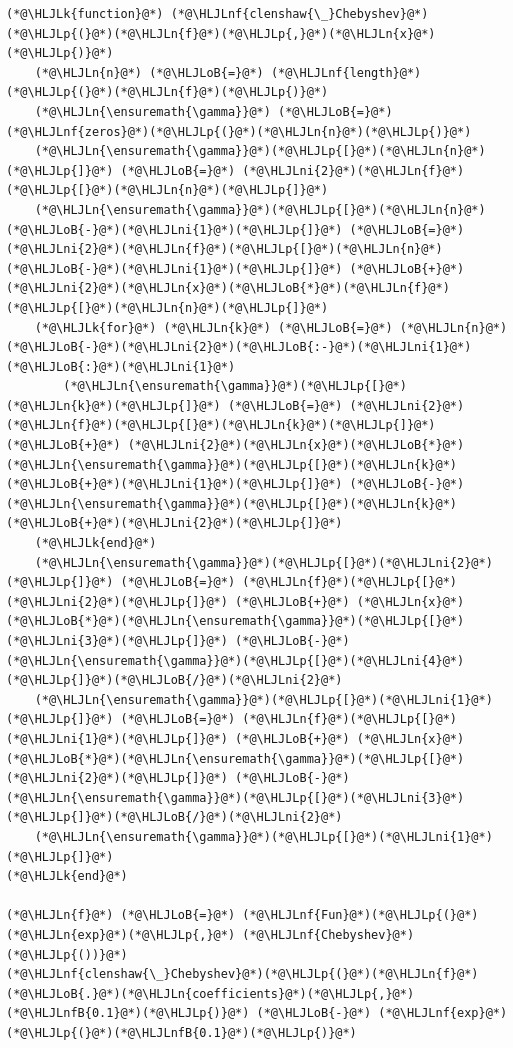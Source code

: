 \documentclass[12pt,a4paper]{article}
\newcommand{\HLJLk}[1]{\textcolor[RGB]{148,91,176}{\textbf{#1}}}
\newcommand{\HLJLn}[1]{#1}
\newcommand{\HLJLnf}[1]{\textcolor[RGB]{66,102,213}{#1}}
\newcommand{\HLJLnfB}[1]{\textcolor[RGB]{59,151,46}{#1}}
\newcommand{\HLJLni}[1]{\textcolor[RGB]{59,151,46}{#1}}
\newcommand{\HLJLoB}[1]{\textcolor[RGB]{102,102,102}{\textbf{#1}}}
\newcommand{\HLJLp}[1]{#1}
\begin{document}
\begin{lstlisting}
(*@\HLJLk{function}@*) (*@\HLJLnf{clenshaw{\_}Chebyshev}@*)(*@\HLJLp{(}@*)(*@\HLJLn{f}@*)(*@\HLJLp{,}@*)(*@\HLJLn{x}@*)(*@\HLJLp{)}@*)
    (*@\HLJLn{n}@*) (*@\HLJLoB{=}@*) (*@\HLJLnf{length}@*)(*@\HLJLp{(}@*)(*@\HLJLn{f}@*)(*@\HLJLp{)}@*)
    (*@\HLJLn{\ensuremath{\gamma}}@*) (*@\HLJLoB{=}@*) (*@\HLJLnf{zeros}@*)(*@\HLJLp{(}@*)(*@\HLJLn{n}@*)(*@\HLJLp{)}@*)
    (*@\HLJLn{\ensuremath{\gamma}}@*)(*@\HLJLp{[}@*)(*@\HLJLn{n}@*)(*@\HLJLp{]}@*) (*@\HLJLoB{=}@*) (*@\HLJLni{2}@*)(*@\HLJLn{f}@*)(*@\HLJLp{[}@*)(*@\HLJLn{n}@*)(*@\HLJLp{]}@*)
    (*@\HLJLn{\ensuremath{\gamma}}@*)(*@\HLJLp{[}@*)(*@\HLJLn{n}@*)(*@\HLJLoB{-}@*)(*@\HLJLni{1}@*)(*@\HLJLp{]}@*) (*@\HLJLoB{=}@*) (*@\HLJLni{2}@*)(*@\HLJLn{f}@*)(*@\HLJLp{[}@*)(*@\HLJLn{n}@*)(*@\HLJLoB{-}@*)(*@\HLJLni{1}@*)(*@\HLJLp{]}@*) (*@\HLJLoB{+}@*)(*@\HLJLni{2}@*)(*@\HLJLn{x}@*)(*@\HLJLoB{*}@*)(*@\HLJLn{f}@*)(*@\HLJLp{[}@*)(*@\HLJLn{n}@*)(*@\HLJLp{]}@*)
    (*@\HLJLk{for}@*) (*@\HLJLn{k}@*) (*@\HLJLoB{=}@*) (*@\HLJLn{n}@*)(*@\HLJLoB{-}@*)(*@\HLJLni{2}@*)(*@\HLJLoB{:-}@*)(*@\HLJLni{1}@*)(*@\HLJLoB{:}@*)(*@\HLJLni{1}@*)
        (*@\HLJLn{\ensuremath{\gamma}}@*)(*@\HLJLp{[}@*)(*@\HLJLn{k}@*)(*@\HLJLp{]}@*) (*@\HLJLoB{=}@*) (*@\HLJLni{2}@*)(*@\HLJLn{f}@*)(*@\HLJLp{[}@*)(*@\HLJLn{k}@*)(*@\HLJLp{]}@*) (*@\HLJLoB{+}@*) (*@\HLJLni{2}@*)(*@\HLJLn{x}@*)(*@\HLJLoB{*}@*)(*@\HLJLn{\ensuremath{\gamma}}@*)(*@\HLJLp{[}@*)(*@\HLJLn{k}@*)(*@\HLJLoB{+}@*)(*@\HLJLni{1}@*)(*@\HLJLp{]}@*) (*@\HLJLoB{-}@*) (*@\HLJLn{\ensuremath{\gamma}}@*)(*@\HLJLp{[}@*)(*@\HLJLn{k}@*)(*@\HLJLoB{+}@*)(*@\HLJLni{2}@*)(*@\HLJLp{]}@*)
    (*@\HLJLk{end}@*)
    (*@\HLJLn{\ensuremath{\gamma}}@*)(*@\HLJLp{[}@*)(*@\HLJLni{2}@*)(*@\HLJLp{]}@*) (*@\HLJLoB{=}@*) (*@\HLJLn{f}@*)(*@\HLJLp{[}@*)(*@\HLJLni{2}@*)(*@\HLJLp{]}@*) (*@\HLJLoB{+}@*) (*@\HLJLn{x}@*)(*@\HLJLoB{*}@*)(*@\HLJLn{\ensuremath{\gamma}}@*)(*@\HLJLp{[}@*)(*@\HLJLni{3}@*)(*@\HLJLp{]}@*) (*@\HLJLoB{-}@*) (*@\HLJLn{\ensuremath{\gamma}}@*)(*@\HLJLp{[}@*)(*@\HLJLni{4}@*)(*@\HLJLp{]}@*)(*@\HLJLoB{/}@*)(*@\HLJLni{2}@*)
    (*@\HLJLn{\ensuremath{\gamma}}@*)(*@\HLJLp{[}@*)(*@\HLJLni{1}@*)(*@\HLJLp{]}@*) (*@\HLJLoB{=}@*) (*@\HLJLn{f}@*)(*@\HLJLp{[}@*)(*@\HLJLni{1}@*)(*@\HLJLp{]}@*) (*@\HLJLoB{+}@*) (*@\HLJLn{x}@*)(*@\HLJLoB{*}@*)(*@\HLJLn{\ensuremath{\gamma}}@*)(*@\HLJLp{[}@*)(*@\HLJLni{2}@*)(*@\HLJLp{]}@*) (*@\HLJLoB{-}@*) (*@\HLJLn{\ensuremath{\gamma}}@*)(*@\HLJLp{[}@*)(*@\HLJLni{3}@*)(*@\HLJLp{]}@*)(*@\HLJLoB{/}@*)(*@\HLJLni{2}@*)
    (*@\HLJLn{\ensuremath{\gamma}}@*)(*@\HLJLp{[}@*)(*@\HLJLni{1}@*)(*@\HLJLp{]}@*)
(*@\HLJLk{end}@*)

(*@\HLJLn{f}@*) (*@\HLJLoB{=}@*) (*@\HLJLnf{Fun}@*)(*@\HLJLp{(}@*)(*@\HLJLn{exp}@*)(*@\HLJLp{,}@*) (*@\HLJLnf{Chebyshev}@*)(*@\HLJLp{())}@*)
(*@\HLJLnf{clenshaw{\_}Chebyshev}@*)(*@\HLJLp{(}@*)(*@\HLJLn{f}@*)(*@\HLJLoB{.}@*)(*@\HLJLn{coefficients}@*)(*@\HLJLp{,}@*) (*@\HLJLnfB{0.1}@*)(*@\HLJLp{)}@*) (*@\HLJLoB{-}@*) (*@\HLJLnf{exp}@*)(*@\HLJLp{(}@*)(*@\HLJLnfB{0.1}@*)(*@\HLJLp{)}@*)
\end{lstlisting}
\end{document}
